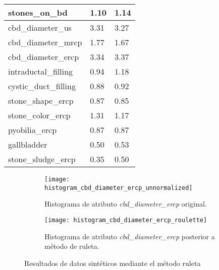 \begin{table}[!htb]
\begin{tabular}{|l|ll|}
stones\_on\_bd                                           & \multicolumn{1}{l|}{1.10}              & 1.14                                 \\ \hline
cbd\_diameter\_us                                        & \multicolumn{1}{l|}{3.31}              & 3.27                                 \\ \hline
cbd\_diameter\_mrcp                                      & \multicolumn{1}{l|}{1.77}              & 1.67                                 \\ \hline
cbd\_diameter\_ercp                                      & \multicolumn{1}{l|}{3.34}              & 3.37                                 \\ \hline
intraductal\_filling                                     & \multicolumn{1}{l|}{0.94}              & 1.18                                 \\ \hline
cystic\_duct\_filling                                    & \multicolumn{1}{l|}{0.88}              & 0.92                                 \\ \hline
stone\_shape\_ercp                                       & \multicolumn{1}{l|}{0.87}              & 0.85                                 \\ \hline
stone\_color\_ercp                                       & \multicolumn{1}{l|}{1.31}              & 1.17                                 \\ \hline
pyobilia\_ercp                                           & \multicolumn{1}{l|}{0.87}              & 0.87                                 \\ \hline
gallbladder                                              & \multicolumn{1}{l|}{0.50}              & 0.53                                 \\ \hline
stone\_sludge\_ercp                                      & \multicolumn{1}{l|}{0.35}              & 0.50                                 \\ \hline
\end{tabular}
\end{table}

\begin{figure}[!htb]
	\centering
	\begin{subfigure}[b]{0.4\textwidth}
		\centering
		\texttt{[image: histogram\_cbd\_diameter\_ercp\_unnormalized]}
		\caption{Histograma de atributo \emph{cbd\_diameter\_ercp} original.}
	\end{subfigure}
	\hfill
	\begin{subfigure}[b]{0.4\textwidth}
		\centering
		\texttt{[image: histogram\_cbd\_diameter\_ercp\_roulette]}
		\caption{Histograma de atributo \emph{cbd\_diameter\_ercp} posterior a método de ruleta.}
	\end{subfigure}
	\caption{Resultados de datos sintéticos mediante el método ruleta}
	\label{Fig: roulette-hist}
\end{figure}


